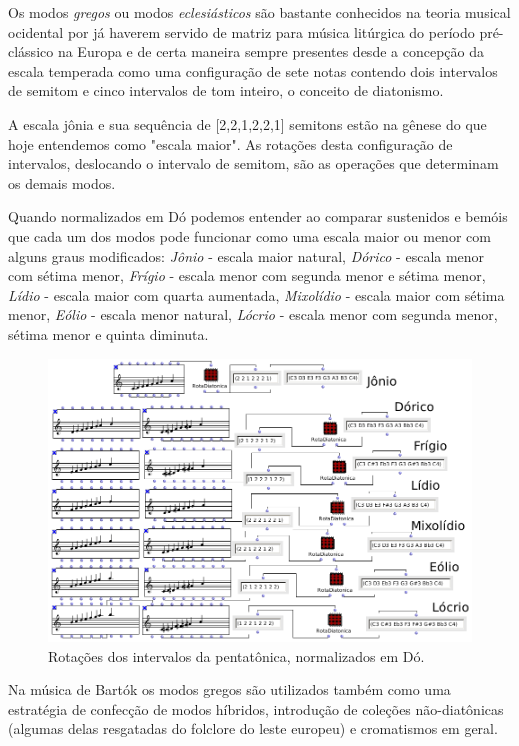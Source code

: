 \documentclass[
	12pt,				%
	openright,			%
	twoside,			%
	a4paper,			%
	english,			%
	french,				%
	spanish,			%
	brazil				%
	]{abntex2}
\begin{document}
Os modos \textit{gregos} ou modos \textit{eclesiásticos} são bastante conhecidos na teoria musical ocidental por já haverem servido de matriz para música litúrgica do período pré-clássico na Europa e de certa maneira sempre presentes desde a concepção da escala temperada como uma configuração de sete notas contendo dois intervalos de semitom e cinco intervalos de tom inteiro, o conceito de diatonismo. 

A escala jônia e sua sequência de [2,2,1,2,2,1] semitons estão na gênese do que hoje entendemos como "escala maior". As rotações desta configuração de intervalos, deslocando o intervalo de semitom, são as operações que determinam os demais modos. 

Quando normalizados em Dó podemos entender ao comparar sustenidos e bemóis que cada um dos modos pode funcionar como uma escala maior ou menor com alguns graus modificados: \textit{Jônio} - escala maior natural, \textit{Dórico} -   escala menor com sétima menor, \textit{Frígio} - escala menor com segunda menor e sétima menor, \textit{Lídio} - escala maior com quarta aumentada, \textit{Mixolídio} - escala maior com sétima menor, \textit{Eólio} - escala menor natural, \textit{Lócrio} - escala menor com segunda menor, sétima menor e quinta diminuta.

\begin{figure}[!h]
	\caption{\label{fig_grafico}Rotações dos intervalos da pentatônica, normalizados em Dó. }
	\begin{center}
	    \includegraphics[scale=0.5]{modal/modal.png}
	\end{center}
\end{figure}


Na música de Bartók os modos gregos são utilizados também como uma estratégia de confecção de modos híbridos, introdução de coleções não-diatônicas (algumas delas resgatadas do folclore do leste europeu) e cromatismos em geral.
\end{document}
